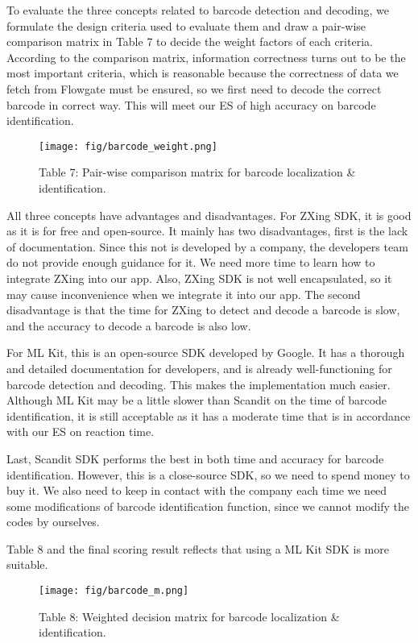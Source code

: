 \documentclass[11pt,a4paper]{article}
\begin{document}
\begin{onehalfspace}
To evaluate the three concepts related to barcode detection and decoding, we formulate the design criteria used to evaluate them and draw a pair-wise comparison matrix in Table 7 to decide the weight factors of each criteria. According to the comparison matrix, information correctness turns out to be the most important criteria, which is reasonable because the correctness of data we fetch from Flowgate must be ensured, so we first need to decode the correct barcode in correct way. This will meet our ES of high accuracy on barcode identification.

\begin{figure}[H]
    \centering
    \caption*{Table 7: Pair-wise comparison matrix for barcode localization \& identification.}
    \texttt{[image: fig/barcode\_weight.png]}
\end{figure}


All three concepts have advantages and disadvantages. For ZXing SDK, it is good as it is for free and open-source. It mainly has two disadvantages, first is the lack of documentation. Since this not is developed by a company, the developers team do not provide enough guidance for it. We need more time to learn how to integrate ZXing into our app. Also, ZXing SDK is not well encapsulated, so it may cause inconvenience when we integrate it into our app. The second disadvantage is that the time for ZXing to detect and decode a barcode is slow, and the accuracy to decode a barcode is also low.   


For ML Kit, this is an open-source SDK developed by Google. It has a thorough and detailed documentation for developers, and is already well-functioning for barcode detection and decoding. This makes the implementation much easier. Although ML Kit may be a little slower than Scandit on the time of barcode identification, it is still acceptable as it has a moderate time that is in accordance with our ES on reaction time. 

Last, Scandit SDK performs the best in both time and accuracy for barcode identification. However, this is a close-source SDK, so we need to spend money to buy it. We also need to keep in contact with the company each time we need some modifications of barcode identification function, since we cannot modify the codes by ourselves.


Table 8 and the final scoring result reflects that using a ML Kit SDK is more suitable.

\begin{figure}[H]
    \centering
    \caption*{Table 8: Weighted decision matrix for barcode localization \& identification.}
    \texttt{[image: fig/barcode\_m.png]}
\end{figure}


\end{onehalfspace}
\end{document}
